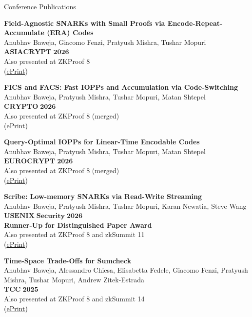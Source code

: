 \documentclass[
	11pt, %
]{resume} %
\begin{document}
\begin{rSection}{Conference Publications}

        \textbf{Field-Agnostic SNARKs with Small Proofs via Encode-Repeat-Accumulate (ERA) Codes} \\ 
	Anubhav Baweja, Giacomo Fenzi, Pratyush Mishra, Tushar Mopuri \\
        $\mathbf{ASIACRYPT} \; \mathbf{2026}$ \\
        Also presented at ZKProof 8 \\
        (\href{https://eprint.iacr.org/2026/864}{ePrint})

        \textbf{FICS and FACS: Fast IOPPs and Accumulation via Code-Switching} \\ 
	Anubhav Baweja, Pratyush Mishra, Tushar Mopuri, Matan Shtepel \\
        $\mathbf{CRYPTO} \; \mathbf{2026}$ \\
        Also presented at ZKProof 8 (merged) \\
        (\href{https://eprint.iacr.org/2025/737}{ePrint})

        \textbf{Query-Optimal IOPPs for Linear-Time Encodable Codes} \\ 
	Anubhav Baweja, Pratyush Mishra, Tushar Mopuri, Matan Shtepel \\
        $\mathbf{EUROCRYPT} \; \mathbf{2026}$ \\
        Also presented at ZKProof 8 (merged) \\
        (\href{https://eprint.iacr.org/2025/1588}{ePrint})

        \textbf{Scribe: Low-memory SNARKs via Read-Write Streaming} \\ 
	Anubhav Baweja, Pratyush Mishra, Tushar Mopuri, Karan Newatia, Steve Wang \\
        $\mathbf{USENIX} \; \mathbf{Security} \; \mathbf{2026}$ \\
        \textbf{Runner-Up for Distinguished Paper Award} \\
        Also presented at ZKProof 8 and zkSummit 11 \\
        (\href{https://eprint.iacr.org/2024/1970}{ePrint})

        \textbf{Time-Space Trade-Offs for Sumcheck} \\ 
	Anubhav Baweja, Alessandro Chiesa, Elisabetta Fedele, Giacomo Fenzi, Pratyush Mishra, Tushar Mopuri, Andrew Zitek-Estrada \\
        $\mathbf{TCC} \; \mathbf{2025}$ \\
        Also presented at ZKProof 8 and zkSummit 14 \\
        (\href{https://eprint.iacr.org/2025/1473}{ePrint})


\end{rSection}
\end{document}
